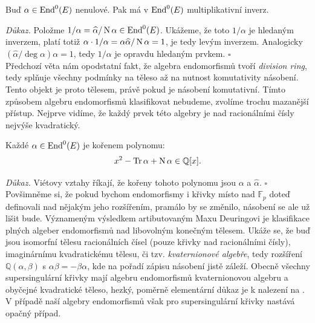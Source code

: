 \documentclass[12pt]{report}
\begin{document}
\begin{dusledek}
Buď $\alpha \in \operatorname{End}^0 (E)$ nenulové. Pak má v $\operatorname{End}^0 (E)$ multiplikativní inverz.
\end{dusledek}
\noindent \textit{Důkaz.} Položme $1/\alpha = \widehat{\alpha}/\operatorname{N} \alpha \in \operatorname{End}^0 (E)$. Ukážeme, že toto $1/\alpha$ je hledaným inverzem, platí totiž $\alpha \cdot 1/ \alpha = \alpha \widehat{\alpha} /\operatorname{N} \alpha = 1$, je tedy levým inverzem. Analogicky $(\widehat{\alpha}/\deg \alpha) \alpha =  1$, tedy $1/\alpha$ je opravdu hledaným prvkem. \hfill $\square$\\

Předchozí věta nám opodstatní fakt, že algebra endomorfismů tvoří \textit{division ring}, tedy splňuje všechny podmínky na těleso až na nutnost komutativity násobení. Tento objekt je proto tělesem, právě pokud je násobení komutativní. Tímto způsobem algebru endomorfismů klasifikovat nebudeme, zvolíme trochu mazanější přístup. Nejprve vidíme, že každý prvek této algebry je nad racionálními čísly nejvýše kvadratický.\\

\begin{veta}
Každé $\alpha \in \operatorname{End}^0 (E)$ je kořenem polynomu:
\begin{equation*}
x^2 - \operatorname{Tr} \alpha + \operatorname{N} \alpha \in \mathbb{Q}[x].
\end{equation*}
\end{veta}
\noindent \textit{Důkaz.} Viétovy vztahy říkají, že kořeny tohoto polynomu jsou $\alpha$ a $\widehat{\alpha}$. \hfill $\square$\\

Povšimněme si, že pokud bychom endomorfismy i křivky místo nad $\mathbb{F}_p$ doteď definovali nad nějakým jeho rozšířením, pramálo by se změnilo, násobení se ale už lišit bude. Význameným výsledkem artibutovaným Maxu Deuringovi \cite{Deuring} je klasifikace plných algeber endomorfismů nad libovolným konečným tělesem. Ukáže se, že buď jsou isomorfní tělesu racionálních čísel (pouze křivky nad racionálními čísly), imaginárnímu kvadratickému tělesu, či tzv. \textit{kvaternionové algebře}, tedy rozšíření $\mathbb{Q}(\alpha,\beta)$ s $\alpha \beta = - \beta \alpha$, kde na pořadí zápisu násobení jistě záleží. Obecně všechny supersingulární křivky mají algebru endomorfismů kvaternionovou algebru a obyčejné kvadratické těleso, hezký, poměrně elementární důkaz je k nalezení na \cite[Thm. 13.17]{Sutherland}. V případě naší  algebry endomorfismů však pro supersingulární křivky nastává opačný případ.\\
\end{document}
